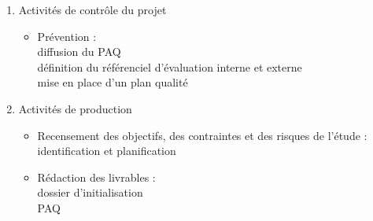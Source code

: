 \begin{enumerate}
\begin{enumerate}
      \item Activités de contrôle du projet
          \begin{itemize}
            \item Prévention :\hfill \\
                  diffusion du PAQ \hfill \\
                  définition du référenciel d'évaluation interne et externe \hfill \\
                  mise en place d'un plan qualité \hfill \\
          \end{itemize}

      \item Activités de production
          \begin{itemize}
            \item Recensement des objectifs, des contraintes et des risques de l'étude :\hfill \\
                  identification et planification \hfill \\
            \item Rédaction des livrables : \hfill \\
                  dossier d'initialisation \hfill \\
                  PAQ \hfill \\
          \end{itemize}
          
    \end{enumerate}

\end{enumerate}